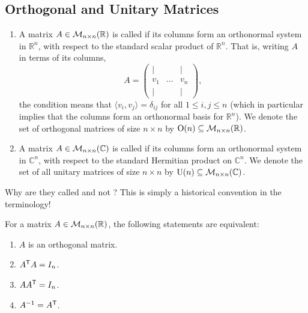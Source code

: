 \subsection*{Orthogonal and Unitary Matrices}

\begin{definition}
\label{def:orthogonal_unitary_matrices}
\begin{enumerate}[label=\textbf{(\alph*)}]
    \item A matrix $A \in \mathcal{M}_{n \times n}(\mathbb{R})$ is called  if its columns form an orthonormal system in $\mathbb{R}^n$, with respect to the standard scalar product of $\mathbb{R}^n$. That is, writing $A$ in terms of its columns,
    \[
        A = \begin{pmatrix} | & & | \\ v_1 & \dots & v_n \\ | & & | \end{pmatrix},
    \]
    the condition means that $\langle v_i, v_j \rangle = \delta_{ij}$ for all $1 \leq i, j \leq n$ (which in particular implies that the columns form an orthonormal basis for $\mathbb{R}^n$). We denote the set of orthogonal matrices of size $n \times n$ by $\operatorname{O}(n) \subseteq \mathcal{M}_{n \times n}(\mathbb{R})$.
    \item A matrix $A \in \mathcal{M}_{n \times n}(\mathbb{C})$ is called  if its columns form an orthonormal system in $\mathbb{C}^n$, with respect to the standard Hermitian product on $\mathbb{C}^n$. We denote the set of all unitary matrices of size $n \times n$ by $\operatorname{U}(n) \subseteq \mathcal{M}_{n \times n}(\mathbb{C})$.
\end{enumerate}
\end{definition}

\begin{remark}
Why are they called  and not ? This is simply a historical convention in the terminology!
\end{remark}

\begin{lemma}
\label{lem:char_orthogonal_matrices}
For a matrix $A \in \mathcal{M}_{n \times n}(\mathbb{R})$, the following statements are equivalent:
\begin{enumerate}[label=\textbf{(\alph*)}]
    \item $A$ is an orthogonal matrix.
    \item $A^{\mathsf{T}} A = I_n$.
    \item $A A^{\mathsf{T}} = I_n$.
    \item $A^{-1} = A^{\mathsf{T}}$.
\end{enumerate}
\end{lemma}

